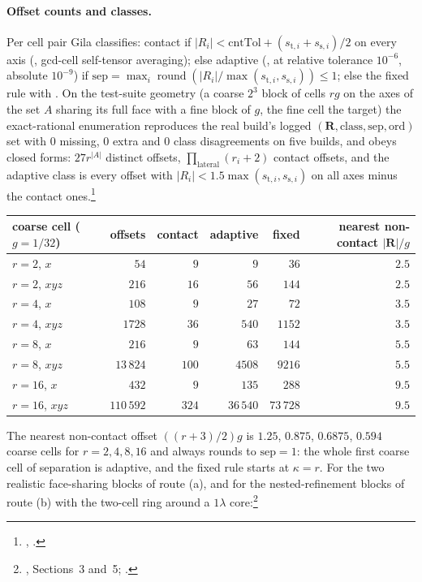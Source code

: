 \paragraph{Offset counts and classes.} Per cell pair Gila classifies: contact if
$|R_i| < \mathrm{cntTol}+(s_{\mathrm{t},i}+s_{\mathrm{s},i})/2$ on every axis
(, gcd-cell self-tensor averaging); else adaptive
(,  at relative tolerance $10^{-6}$, absolute $10^{-9}$) if
$\mathrm{sep} = \max_i\operatorname{round}(|R_i|/\max(s_{\mathrm{t},i},s_{\mathrm{s},i}))\le1$;
else the fixed rule  with . On the test-suite
geometry (a coarse $2^3$ block of cells $rg$ on the axes of the set $A$ sharing its full
face with a fine block of $g$, the fine cell the target) the exact-rational enumeration
reproduces the real build's logged $(\mathbf{R},\text{class},\mathrm{sep},\mathrm{ord})$
set with $0$ missing, $0$ extra and $0$ class disagreements on five builds, and obeys
closed forms: $27r^{|A|}$ distinct offsets, $\prod_{\text{lateral}}(r_i+2)$ contact
offsets, and the adaptive class is every offset with $|R_i|<1.5\max(s_{\mathrm{t},i},s_{\mathrm{s},i})$
on all axes minus the contact ones.\footnote{,
.}

\begin{center}\footnotesize
\begin{tabular}{@{}lrrrrr@{}}
\toprule
coarse cell ($g = 1/32$) & offsets & contact & adaptive & fixed & nearest non-contact $|\mathbf{R}|/g$\\
\midrule
$r=2$, $x$ & $54$ & $9$ & $9$ & $36$ & $2.5$\\
$r=2$, $xyz$ & $216$ & $16$ & $56$ & $144$ & $2.5$\\
$r=4$, $x$ & $108$ & $9$ & $27$ & $72$ & $3.5$\\
$r=4$, $xyz$ & $1728$ & $36$ & $540$ & $1152$ & $3.5$\\
$r=8$, $x$ & $216$ & $9$ & $63$ & $144$ & $5.5$\\
$r=8$, $xyz$ & $13\,824$ & $100$ & $4508$ & $9216$ & $5.5$\\
$r=16$, $x$ & $432$ & $9$ & $135$ & $288$ & $9.5$\\
$r=16$, $xyz$ & $110\,592$ & $324$ & $36\,540$ & $73\,728$ & $9.5$\\
\bottomrule
\end{tabular}
\end{center}

\noindent
The nearest non-contact offset $((r+3)/2)g$ is $1.25$, $0.875$, $0.6875$, $0.594$ coarse
cells for $r = 2,4,8,16$ and always rounds to $\mathrm{sep} = 1$: the whole first coarse
cell of separation is adaptive, and the fixed rule starts at $\kappa = r$. For the two
realistic face-sharing blocks of route (a), and for the nested-refinement blocks of
route (b) with the two-cell ring around a $1\lambda$ core:\footnote{, Sections~3 and~5;
.}

